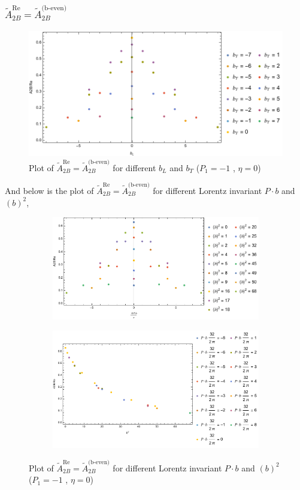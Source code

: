 \documentclass[]{article}
\numberwithin{equation}{section}
\newcommand{\tAmp}{\widetilde{A}}
\newcommand{\tAmp}{\ensuremath{\widetilde{A}^{(+)}}}
\begin{document}
\subsubsection{$\tAmp^{\text{Re}}_{2B}=\tAmp^{\text{(b-even)}}_{2B}$}
\begin{figure}[h!]
    \centering
    \includegraphics[width=0.45\linewidth]{bLbT_A2B_b_even_P1_-1_eta_0.pdf}
    \caption{Plot of  $\tAmp^{\text{Re}}_{2B}=\tAmp^{\text{(b-even)}}_{2B}$ for different $b_{L}$ and $b_{T}$  ($P_{1} = -1$ , $\eta=0$)}
\end{figure}

And below is the plot of $\tAmp^{\text{Re}}_{2B}=\tAmp^{\text{(b-even)}}_{2B}$ for different Lorentz invariant $P\cdot b$ and $(b)^2$,
\begin{figure}[h!]
     \centering
     \begin{subfigure}[b]{0.45\textwidth}
         \centering
         \includegraphics[width=\textwidth]{bP_A2B_b_even_P1_-1_eta_0.pdf}
     \end{subfigure}
     \begin{subfigure}[b]{0.45\textwidth}
         \centering
         \includegraphics[width=\textwidth]{bsq_A2B_b_even_P1_-1_eta_0.pdf}
     \end{subfigure}
        \caption{Plot of $\tAmp^{\text{Re}}_{2B}=\tAmp^{\text{(b-even)}}_{2B}$ for different Lorentz invariant $P\cdot b$ and $(b)^2$  ($P_{1} = -1$ , $\eta=0$)}
\end{figure}
\end{document}
